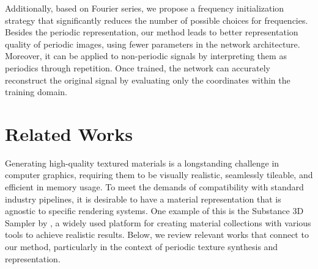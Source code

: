 Additionally, based on Fourier series, we propose a frequency initialization strategy that significantly reduces the number of possible choices for frequencies. Besides the periodic representation, our method leads to better representation quality of periodic images, using fewer parameters in the network architecture. Moreover, it can be applied to non-periodic signals by interpreting them as periodics through repetition. Once trained, the network can accurately reconstruct the original signal by evaluating only the coordinates within the training domain.

\section{Related Works}



Generating high-quality textured materials is a longstanding challenge in computer graphics, requiring them to be visually realistic, seamlessly tileable, and efficient in memory usage. To meet the demands of compatibility with standard industry pipelines, it is desirable to have a material representation that is agnostic to specific rendering systems. One example of this is the Substance 3D Sampler by \citet{substance_sampler}, a widely used platform for creating material collections with various tools to achieve realistic results. Below, we review relevant works that connect to our method, particularly in the context of periodic texture synthesis and representation.


